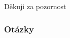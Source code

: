 \documentclass{beamer}
\begin{document}

\begin{frame}
\Huge{\centerline{Děkuji za pozornost}}
\end{frame}


	
\begin{frame}
    \frametitle{Otázky}
\end{frame}
\end{document}
